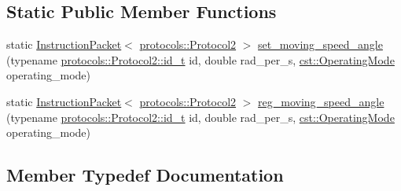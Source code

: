 \subsection*{Static Public Member Functions}
\begin{DoxyCompactItemize}
\item 
static \hyperlink{classdynamixel_1_1_instruction_packet}{Instruction\+Packet}$<$ \hyperlink{classdynamixel_1_1protocols_1_1_protocol2}{protocols\+::\+Protocol2} $>$ \hyperlink{classdynamixel_1_1servos_1_1_protocol_specific_packets_3_01_m_00_01protocols_1_1_protocol2_01_4_a366ea0ab92847a3cbacdb398934cabbb}{set\+\_\+moving\+\_\+speed\+\_\+angle} (typename \hyperlink{classdynamixel_1_1protocols_1_1_protocol2_a38d9cae72cd86213cca74e718c240429}{protocols\+::\+Protocol2\+::id\+\_\+t} id, double rad\+\_\+per\+\_\+s, \hyperlink{namespacedynamixel_1_1servos_1_1cst_ac17b5608f65c6495114d34f8efc4d809}{cst\+::\+Operating\+Mode} operating\+\_\+mode)
\item 
static \hyperlink{classdynamixel_1_1_instruction_packet}{Instruction\+Packet}$<$ \hyperlink{classdynamixel_1_1protocols_1_1_protocol2}{protocols\+::\+Protocol2} $>$ \hyperlink{classdynamixel_1_1servos_1_1_protocol_specific_packets_3_01_m_00_01protocols_1_1_protocol2_01_4_a3dcf288a975f802ad748220e5e6ae52f}{reg\+\_\+moving\+\_\+speed\+\_\+angle} (typename \hyperlink{classdynamixel_1_1protocols_1_1_protocol2_a38d9cae72cd86213cca74e718c240429}{protocols\+::\+Protocol2\+::id\+\_\+t} id, double rad\+\_\+per\+\_\+s, \hyperlink{namespacedynamixel_1_1servos_1_1cst_ac17b5608f65c6495114d34f8efc4d809}{cst\+::\+Operating\+Mode} operating\+\_\+mode)
\end{DoxyCompactItemize}


\subsection{Member Typedef Documentation}
